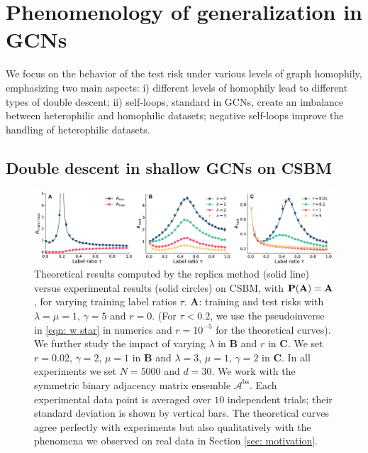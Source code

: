 \documentclass[9pt,twocolumn]{pnas-new}
\begin{document}

\section{Phenomenology of generalization in GCNs}\label{sec: phenomena}

We focus on the behavior of the test risk under various levels of graph homophily, emphasizing two main aspects: i) different levels of homophily lead to different types of double descent; ii) self-loops, standard in GCNs, create an imbalance between heterophilic and homophilic datasets; negative self-loops improve the handling of heterophilic datasets.

\subsection*{Double descent in shallow GCNs on CSBM}
\begin{figure}[h]
        \centering
        \includegraphics[width=\textwidth]{figs_v.pdf}
        \caption{Theoretical results computed by the replica method (solid line) versus experimental results (solid circles) on CSBM, with $\mathbf{P}(\mathbf{A})=\mathbf{A}$, for varying training label ratios $\tau$. \textbf{\textsc{A}}: training and test risks with $\lambda=\mu=1$, $\gamma=5$ and $r=0$. (For $\tau<0.2$, we use the pseudoinverse in \eqref{eqn: w star} in numerics and $r=10^{-5}$ for the theoretical curves). We further study the impact of varying $\lambda$  in  \textbf{\textsf{B}} and $r$ in  \textbf{\textsf{C}}. We set $r=0.02$, $\gamma=2$, $\mu=1$ in  \textbf{\textsf{B}} and $\lambda=3$, $\mu=1$, $\gamma=2$ in  \textbf{\textsf{C}}. In all experiments we set $N=5000$ and $d=30$. We work with the symmetric binary adjacency matrix ensemble $\mathcal{A}^{\text{bs}}$. Each experimental data point is averaged over $10$ independent trials; their standard deviation is shown by vertical bars. The theoretical curves agree perfectly with experiments but also qualitatively with the phenomena we observed on real data in Section \ref{sec: motivation}.} 
        \label{fig_v}
\end{figure}
\end{document}
